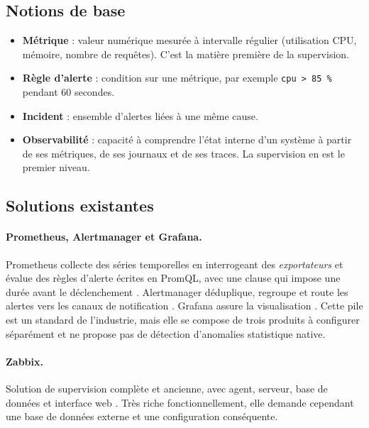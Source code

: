 \subsection{Notions de base}

\begin{itemize}
  \item \textbf{Métrique} : valeur numérique mesurée à intervalle régulier (utilisation CPU,
        mémoire, nombre de requêtes). C'est la matière première de la supervision.
  \item \textbf{Règle d'alerte} : condition sur une métrique, par exemple
        \texttt{cpu > 85~\%} pendant 60 secondes.
  \item \textbf{Incident} : ensemble d'alertes liées à une même cause.
  \item \textbf{Observabilité} : capacité à comprendre l'état interne d'un système à partir
        de ses métriques, de ses journaux et de ses traces. La supervision en est le premier
        niveau.
\end{itemize}

\subsection{Solutions existantes}

\paragraph{Prometheus, Alertmanager et Grafana.}
Prometheus collecte des séries temporelles en interrogeant des \emph{exportateurs} et évalue
des règles d'alerte écrites en PromQL, avec une clause  qui impose une durée avant
le déclenchement \cite{prometheus-rules}. Alertmanager déduplique, regroupe et route les
alertes vers les canaux de notification \cite{alertmanager}. Grafana assure la
visualisation \cite{grafana}. Cette pile est un standard de l'industrie, mais elle se compose
de trois produits à configurer séparément et ne propose pas de détection d'anomalies
statistique native.

\paragraph{Zabbix.}
Solution de supervision complète et ancienne, avec agent, serveur, base de données et
interface web \cite{zabbix}. Très riche fonctionnellement, elle demande cependant une base de
données externe et une configuration conséquente.

